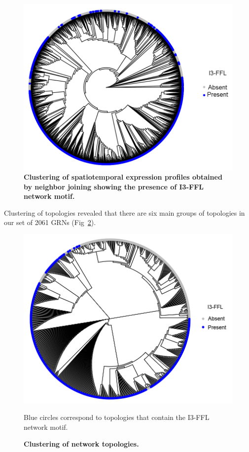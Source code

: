 \documentclass[10pt,letterpaper]{article}
\begin{document}
\begin{figure}[!h]
 \includegraphics[width=\textwidth]{figures/results/spatio-temporal-profile-clustering-i3-ffl}
 \caption{\bf Clustering of spatiotemporal expression profiles obtained by
 neighbor joining showing the presence of I3-FFL network motif.}
 \label{fig:exp-tree}
\end{figure}

Clustering of topologies revealed that there are six main groups of topologies
in our set of 2061 GRNs (Fig~\ref{fig:subg-tree}).

\begin{figure}[!h]
 \includegraphics[width=\textwidth]{figures/results/subgraph-profile-clustering-i3-ffl}
 \caption{\bf Clustering of network topologies.}
 Blue circles correspond to topologies that contain the I3-FFL network motif.
 \label{fig:subg-tree}
\end{figure}
\end{document}
